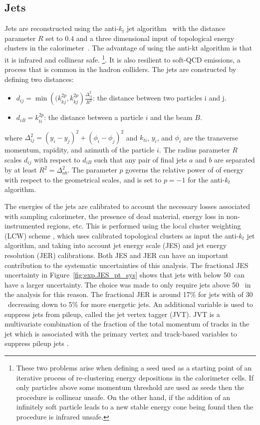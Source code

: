 \subsection{Jets}
Jets are reconstructed using the anti-$k_{t}$ jet algorithm~\cite{Cacciari:2008gp} 
with the distance parameter $R$ set to $0.4$ and 
a three dimensional input of topological energy clusters in the 
calorimeter~\cite{PERF-2014-07}. 
The advantage of using the anti-kt algorithm is that it is infrared
 and collinear safe.
\footnote{These two problems arise when defining a seed used 
as a starting point of an iterative process of re-clustering energy 
depositions in the calorimeter cells.
If only particles above some momentum threshold are used as seeds then the 
procedure is collinear unsafe. On the other hand, if the addition of an 
infinitely soft particle leads to a new stable energy cone being found then 
the procedure is infrared unsafe.
}.
It is also resilient to soft-QCD emissions, a process that is common in the hadron colliders.
The jets are constructed by defining two distances:
\begin{itemize}
\item $d_{ij} = \min\left((k_{kj}^{2p},k_{kj}^{2p}\right)\frac{\Delta_{ij}^2}{R^2}$: the distance between two particles i and j.
\item $d_{iB} = k_{ti}^{2p}$: the distance between a particle $i$ and the beam $B$.
\end{itemize}
where $\Delta_{ij}^2 = \left( y_i - y_j\right)^2 + \left(\phi_i - \phi_j\right)^2$ and $k_{ti}$, $y_i$, and $\phi_i$ are the transverse momentum, rapidity, and azimuth of the 
particle $i$. The radius parameter $R$ scales $d_{ij}$ with respect to $d_{iB}$ such that any pair of final jets $a$ and $b$ are separated by at least $R^2=\Delta_{ab}^2$.
The parameter $p$ governs the relative power of of energy with respect to the geometrical scales, and is set to $p=-1$ for the anti-$k_{t}$ algorithm.


The energies of the jets are calibrated to  account the necessary losses associated with sampling calorimeter,
the presence of dead material,  energy loss in non-instrumented regions, etc. This is performed using the local cluster weighting
(LCW) scheme \cite{Aad:2016upyew}, which uses calibrated topological clusters as input the anti-$k_{t}$ jet algorithm,
and taking into account jet energy scale (JES) and jet energy resolution (JER) calibrations.
Both JES and JER can have an important contribution to the systematic uncertainties of this analysis.
The fractional JES uncertainty in Figure~\ref{fig:exp.JES_pt_sys} shows that jets with \pt below 50\GeV~can have a larger uncertainty.
The choice was made to only require jets above 50 \GeV~in the analysis for this reason.
The fractional JER is around 17\% for jets with \pt of 30 \GeV~decreasing down to 5\% for more energetic jets.
An additional variable is used to suppress jets from pileup, called the jet vertex tagger (JVT).
JVT is a multivariate combination of the fraction of the total momentum of tracks in the jet which is associated with the primary vertex
and  track-based variables to suppress pileup jets \cite{ATL-PHYS-PUB-2015-034}. 

